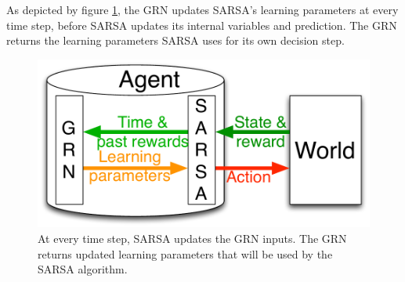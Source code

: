 As depicted by figure \ref{fig:GRNSARSA}, the GRN updates SARSA's learning parameters at every time step, before SARSA updates its internal variables and prediction. The GRN returns the learning parameters SARSA uses for its own decision step.

\begin{figure}
\center
\includegraphics[width=0.7\linewidth]{GRNSARSA.pdf}
\caption{At every time step, SARSA updates the GRN inputs. The GRN returns updated learning parameters that will be used by the SARSA algorithm.}\label{fig:GRNSARSA}
\end{figure}


